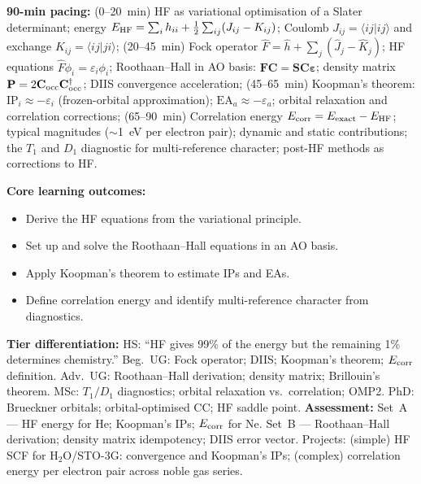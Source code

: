 \documentclass[11pt,a4paper]{article}
\begin{document}
\begin{tcolorbox}[chembox, title={Module~III.2 --- Lecture L10: Hartree--Fock Theory, Koopman's Theorem, and Correlation Energy}]
\textbf{90-min pacing:} (0--20~min) HF as variational optimisation of a Slater determinant; energy $E_{\rm HF}=\sum_i h_{ii}+\tfrac{1}{2}\sum_{ij}(J_{ij}-K_{ij})$; Coulomb $J_{ij}=\langle ij|ij\rangle$ and exchange $K_{ij}=\langle ij|ji\rangle$; (20--45~min) Fock operator $\hat{F}=\hat{h}+\sum_j(\hat{J}_j-\hat{K}_j)$; HF equations $\hat{F}\phi_i=\varepsilon_i\phi_i$; Roothaan--Hall in AO basis: $\mathbf{F}\mathbf{C}=\mathbf{S}\mathbf{C}\boldsymbol\varepsilon$; density matrix $\mathbf{P}=2\mathbf{C}_{\rm occ}\mathbf{C}_{\rm occ}^\dagger$; DIIS convergence acceleration; (45--65~min) Koopman's theorem: $\text{IP}_i\approx-\varepsilon_i$ (frozen-orbital approximation); $\text{EA}_a\approx-\varepsilon_a$; orbital relaxation and correlation corrections; (65--90~min) Correlation energy $E_{\rm corr}=E_{\rm exact}-E_{\rm HF}$; typical magnitudes ($\sim$1~eV per electron pair); dynamic and static contributions; the $T_1$ and $D_1$ diagnostic for multi-reference character; post-HF methods as corrections to HF.

\medskip\textbf{Core learning outcomes:}
\begin{itemize}[leftmargin=1.4em,topsep=2pt,itemsep=1pt]
  \item Derive the HF equations from the variational principle.
  \item Set up and solve the Roothaan--Hall equations in an AO basis.
  \item Apply Koopman's theorem to estimate IPs and EAs.
  \item Define correlation energy and identify multi-reference character from diagnostics.
\end{itemize}
\medskip\textbf{Tier differentiation:}
HS: ``HF gives 99\% of the energy but the remaining 1\% determines chemistry.''
Beg.\ UG: Fock operator; DIIS; Koopman's theorem; $E_{\rm corr}$ definition.
Adv.\ UG: Roothaan--Hall derivation; density matrix; Brillouin's theorem.
MSc: $T_1/D_1$ diagnostics; orbital relaxation vs.\ correlation; OMP2.
PhD: Brueckner orbitals; orbital-optimised CC; HF saddle point.
\medskip\textbf{Assessment:}
Set~A --- HF energy for He; Koopman's IPs; $E_{\rm corr}$ for Ne.
Set~B --- Roothaan--Hall derivation; density matrix idempotency; DIIS error vector.
Projects: (simple) HF SCF for H$_2$O/STO-3G: convergence and Koopman's IPs; (complex) correlation energy per electron pair across noble gas series.
\end{tcolorbox}
\end{document}

